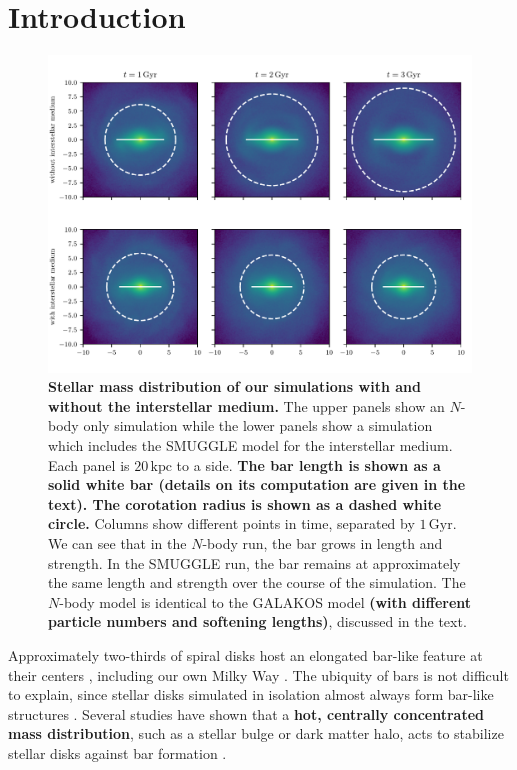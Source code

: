\documentclass[twocolumn,linenumbers,trackchanges]{aastex631}
\newcommand{\Nbody}{$N$-body}
\newcommand{\SMUGGLE}{SMUGGLE}
\begin{document}
\section{Introduction}
\label{sec:intro}
\begin{figure}
    \centering
    \includegraphics[width=\textwidth]{fig/fig1.pdf}
    \caption{{\bf Stellar mass distribution of our simulations with and without
    the interstellar medium.} The upper panels show an \Nbody{} only simulation
    while the lower panels show a simulation which includes the \SMUGGLE{} model
    for the interstellar medium. Each panel is $20\,\textrm{kpc}$ to a side.
    {\bf The bar length is shown as a solid white bar (details on its
    computation are given in the text). The corotation radius is shown as a
    dashed white circle.} Columns show different points in time, separated by
    $1\,\textrm{Gyr}$. We can see that in the \Nbody{} run, the bar grows in
    length and strength. In the \SMUGGLE{} run, the bar remains at approximately
    the same length and strength over the course of the simulation. The \Nbody{}
    model is identical to the GALAKOS model {\bf (with different particle
    numbers and softening lengths)}, discussed in the text.}\label{fig:overview}
\end{figure}

Approximately two-thirds of spiral disks host an elongated bar-like feature at
their centers \citep{2000AJ....119..536E, 2007ApJ...657..790M}, including our
own Milky Way \citep{1957AJ.....62...19J, 1991ApJ...379..631B}. The ubiquity of
bars is not difficult to explain, since stellar disks simulated in isolation
almost always form bar-like structures \citep{1971ApJ...168..343H}. Several
studies have shown that a {\bf hot, centrally concentrated mass distribution},
such as a stellar bulge or dark matter halo, acts to stabilize stellar disks
against bar formation \citep[e.g.,][]{1973ApJ...186..467O, 1976AJ.....81...30H}.
\end{document}
